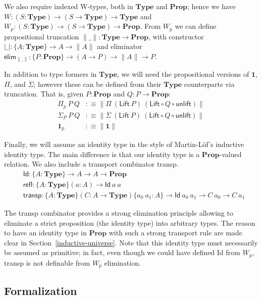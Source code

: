 \documentclass{easychair}
\newcommand{\mType}{\mathbf{Type}}
\newcommand{\mProp}{\mathbf{Prop}}
\begin{document}
We also require indexed W-types, both in $\mType$ and $\mProp$; hence we have $W
: (S : \mType) \to (S \to \mType) \to \mType$ and $W_p : (S : \mType) \to (S \to
\mType) \to \mProp$.
%
From $W_p$ we can define propositional truncation $\|\_\| : \mType \to \mProp$, with constructor
  $|\_| : \{A : \mType \} \to A \to \| A \|$ and eliminator
  $\textsf{elim}_{\|\_\|} : \{P : \mProp \} \to (A \to P) \to \| A \| \to P$.

In addition to type formers in $\mType$, we will need the propositional versions
of $\mathbf{1}$, $\Pi$, and $\Sigma$; however these can be defined from their
$\mType$ counterparts via truncation. That is, given $P : \mProp$ and $Q : P \to
\mProp$:
%
\begin{align*}
  \Pi_p\ P\ Q & :\equiv \| \Pi\ (\textsf{Lift} \ P)\ (\textsf{Lift} \circ Q \circ \textsf{unlift}) \| \\
  \Sigma_P\ P\ Q & :\equiv \| \Sigma\ (\textsf{Lift} \ P)\ (\textsf{Lift} \circ Q \circ \textsf{unlift}) \| \\
  \mathbf{1}_p & :\equiv \| \mathbf{1} \|
\end{align*}

Finally, we will assume an identity type in the style of Martin-L\"of's
inductive identity type. The main difference is that our identity type is a
$\mProp$-valued relation. We also include a transport combinator
\textsf{transp}.
%
\begin{align*}
  & \textsf{Id} : \{A : \mType \} \to A \to A \to \mProp \\
  & \textsf{refl} : \{A : \mType \} (a : A) \to \textsf{Id}\ a\ a \\
  & \textsf{transp} : \{A : \mType \} (C : A \to \mType) \{a_0\ a_1 : A\} \to \textsf{Id}\ a_0\ a_1 \to C\ a_0 \to C\ a_1
\end{align*}

The \textsf{transp} combinator provides a strong elimination principle allowing
to eliminate a strict proposition (the identity type) into arbitrary types.
%
The reason to have an identity type in $\mProp$ with such a strong transport
rule are made clear in Section~\ref{inductive-universe}.
%
Note that this identity type must necessarily be assumed as primitive; in fact,
even though we could have defined \textsf{Id} from $W_p$, \textsf{transp} is not
definable from $W_p$ elimination.

\subsection{Formalization}
\end{document}
